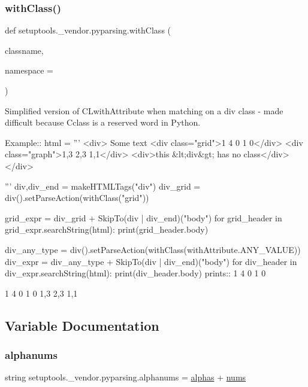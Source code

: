 \subsubsection{\texorpdfstring{with\+Class()}{withClass()}}
{\footnotesize\ttfamily def setuptools.\+\_\+vendor.\+pyparsing.\+with\+Class (\begin{DoxyParamCaption}\item[{}]{classname,  }\item[{}]{namespace = {\ttfamily \textquotesingle{}\textquotesingle{}} }\end{DoxyParamCaption})}

\begin{DoxyVerb}Simplified version of C{L{withAttribute}} when matching on a div class - made
difficult because C{class} is a reserved word in Python.

Example::
    html = '''
        <div>
        Some text
        <div class="grid">1 4 0 1 0</div>
        <div class="graph">1,3 2,3 1,1</div>
        <div>this &lt;div&gt; has no class</div>
        </div>
            
    '''
    div,div_end = makeHTMLTags("div")
    div_grid = div().setParseAction(withClass("grid"))
    
    grid_expr = div_grid + SkipTo(div | div_end)("body")
    for grid_header in grid_expr.searchString(html):
        print(grid_header.body)
    
    div_any_type = div().setParseAction(withClass(withAttribute.ANY_VALUE))
    div_expr = div_any_type + SkipTo(div | div_end)("body")
    for div_header in div_expr.searchString(html):
        print(div_header.body)
prints::
    1 4 0 1 0

    1 4 0 1 0
    1,3 2,3 1,1
\end{DoxyVerb}
 

\subsection{Variable Documentation}
\mbox{\label{namespacesetuptools_1_1__vendor_1_1pyparsing_a9441041befe04d1efb091151a019e0b4}} 
\subsubsection{\texorpdfstring{alphanums}{alphanums}}
{\footnotesize\ttfamily string setuptools.\+\_\+vendor.\+pyparsing.\+alphanums = \hyperlink{namespacesetuptools_1_1__vendor_1_1pyparsing_aa1e79ef7e5382a4dc4dcc6ce37ef91e9}{alphas} + \hyperlink{namespacesetuptools_1_1__vendor_1_1pyparsing_a3f511d6c4190141f2a9105c67f3e1f27}{nums}}

